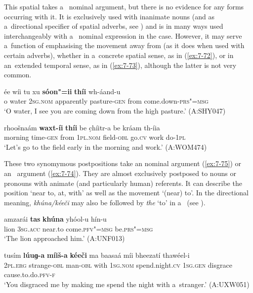 \begin{exe}
 This spatial  takes a~ nominal argument, but there is no evidence for any  forms occurring with it. It is exclusively used with inanimate nouns (and as a~directional specifier of spatial adverbs, see ) and is in many ways used interchangeably with a~ nominal expression in the  case. However, it may serve a~function of emphasising the movement away from (as it does when used with certain adverbs), whether in a~concrete spatial sense, as in (\ref{ex:7-72}), or in an~extended temporal sense, as in (\ref{ex:7-73}), although the latter is not very common.

\begin{exe}
\ex
\label{ex:7-72}
\gll ée wíi tu xu \textbf{sóon"=ii} \textbf{thíi} wh-áand-u \\
o water \textsc{2sg.nom} apparently pasture-\textsc{gen} from  come.down-\textsc{prs"=msg}  \\
\glt `O water, I see you are coming down from the high pasture.' (A:SHY047)
\end{exe}
\begin{exe}
\ex
\label{ex:7-73}
\gll rhoošnaám \textbf{waxt-íi} \textbf{thíi} be c̣híitr-a be kráam th-íia  \\
morning  time-\textsc{gen} from \textsc{1pl.nom} field-\textsc{obl} go.\textsc{cv} work do-\textsc{1pl} \\
\glt `Let's go to the field early in the morning and work.' (A:WOM474)
\end{exe}

 These two synomymous postpositions take an  nominal argument (\ref{ex:7-75}) or an~  argument (\ref{ex:7-74}). They are almost exclusively postposed to nouns or pronouns with animate (and particularly human) referents. It can describe the position `near to, at, with' as well as the movement `(near) to'. In the directional meaning, \textit{khúna/kéeči} may also be followed by \textit{the} `to' in a~ (see ).


\begin{exe}
\ex
\label{ex:7-74}
\gll amzarái \textbf{tas} \textbf{khúna} yhóol-u hín-u \\
lion \textsc{3sg.acc} near.to come.\textsc{pfv"=msg } be.\textsc{prs"=msg} \\
\glt `The lion approached him.' (A:UNF013)
\end{exe}
\begin{exe}
\ex
\label{ex:7-75}
\gll tusím \textbf{lúuɡ-a} \textbf{míiš-a} \textbf{kéeči} ma baasaá míi bheezatí thawéel-i \\
\textsc{2pl.erg} strange-\textsc{obl} man-\textsc{obl} with \textsc{1sg.nom} spend.night.\textsc{cv} \textsc{1sg.gen} disgrace cause.to.do.\textsc{pfv-f} \\
\glt `You disgraced me by making me spend the night with a~stranger.' (A:UXW051)
\end{exe}





\end{exe}
